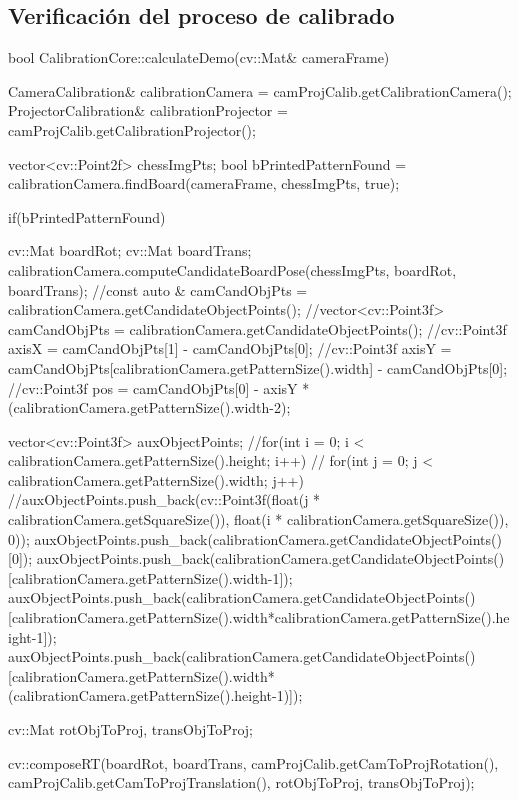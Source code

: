 \subsection{Verificación del proceso de calibrado}
\begin{listing}[
  float=ht,
  language = C++,
  caption  = {Atributos de la clase Demo},
  label    = code:Demo]
 bool CalibrationCore::calculateDemo(cv::Mat& cameraFrame){
    
    CameraCalibration& calibrationCamera = camProjCalib.getCalibrationCamera();
    ProjectorCalibration& calibrationProjector  = camProjCalib.getCalibrationProjector();
    
    vector<cv::Point2f> chessImgPts;
    bool bPrintedPatternFound = calibrationCamera.findBoard(cameraFrame, chessImgPts, true);
    
    if(bPrintedPatternFound) {
    
      cv::Mat boardRot;
      cv::Mat boardTrans;
      calibrationCamera.computeCandidateBoardPose(chessImgPts, boardRot, boardTrans);
      //const auto & camCandObjPts = calibrationCamera.getCandidateObjectPoints();        
      //vector<cv::Point3f> camCandObjPts = calibrationCamera.getCandidateObjectPoints();
      //cv::Point3f axisX = camCandObjPts[1] - camCandObjPts[0];
      //cv::Point3f axisY = camCandObjPts[calibrationCamera.getPatternSize().width] - camCandObjPts[0];
      //cv::Point3f pos   = camCandObjPts[0] - axisY * (calibrationCamera.getPatternSize().width-2);
            
      vector<cv::Point3f> auxObjectPoints;
      //for(int i = 0; i < calibrationCamera.getPatternSize().height; i++)
      //  for(int j = 0; j < calibrationCamera.getPatternSize().width; j++)
      //auxObjectPoints.push_back(cv::Point3f(float(j * calibrationCamera.getSquareSize()), float(i * calibrationCamera.getSquareSize()), 0));
      auxObjectPoints.push_back(calibrationCamera.getCandidateObjectPoints()[0]);
      auxObjectPoints.push_back(calibrationCamera.getCandidateObjectPoints()[calibrationCamera.getPatternSize().width-1]);
      auxObjectPoints.push_back(calibrationCamera.getCandidateObjectPoints()[calibrationCamera.getPatternSize().width*calibrationCamera.getPatternSize().height-1]);
      auxObjectPoints.push_back(calibrationCamera.getCandidateObjectPoints()[calibrationCamera.getPatternSize().width*(calibrationCamera.getPatternSize().height-1)]);
    
         
      cv::Mat rotObjToProj, transObjToProj;
    
      cv::composeRT(boardRot,  boardTrans,
                    camProjCalib.getCamToProjRotation(), camProjCalib.getCamToProjTranslation(),
                    rotObjToProj, transObjToProj);

}}
\end{listing}
